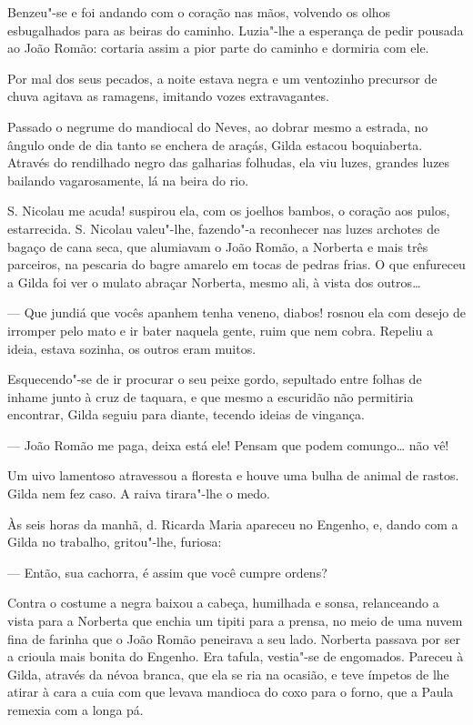 Benzeu"-se e foi andando com o coração nas mãos, volvendo os olhos
esbugalhados para as beiras do caminho. Luzia"-lhe a esperança de pedir
pousada ao João Romão: cortaria assim a pior parte do caminho e dormiria
com ele.

Por mal dos seus pecados, a noite estava negra e um ventozinho precursor
de chuva agitava as ramagens, imitando vozes extravagantes.

Passado o negrume do mandiocal do Neves, ao dobrar mesmo a estrada, no
ângulo onde de dia tanto se enchera de araçás, Gilda estacou
boquiaberta. Através do rendilhado negro das galharias folhudas, ela viu
luzes, grandes luzes bailando vagarosamente, lá na beira do rio.

S. Nicolau me acuda! suspirou ela, com os joelhos bambos, o coração aos
pulos, estarrecida. S. Nicolau valeu"-lhe, fazendo"-a reconhecer nas luzes
archotes de bagaço de cana seca, que alumiavam o João Romão, a Norberta
e mais três parceiros, na pescaria do bagre amarelo em tocas de pedras
frias. O que enfureceu a Gilda foi ver o mulato abraçar Norberta, mesmo
ali, à vista dos outros\ldots{}

--- Que jundiá que vocês apanhem tenha veneno, diabos! rosnou ela com
desejo de irromper pelo mato e ir bater naquela gente, ruim que nem
cobra. Repeliu a ideia, estava sozinha, os outros eram muitos.

Esquecendo"-se de ir procurar o seu peixe gordo, sepultado entre folhas
de inhame junto à cruz de taquara, e que mesmo a escuridão não
permitiria encontrar, Gilda seguiu para diante, tecendo ideias de
vingança.

--- João Romão me paga, deixa está ele! Pensam que podem comungo\ldots{} não
vê!

Um uivo lamentoso atravessou a floresta e houve uma bulha de animal de
rastos. Gilda nem fez caso. A raiva tirara"-lhe o medo.

Às seis horas da manhã, d. Ricarda Maria apareceu no Engenho, e, dando
com a Gilda no trabalho, gritou"-lhe, furiosa:

--- Então, sua cachorra, é assim que você cumpre ordens?

Contra o costume a negra baixou a cabeça, humilhada e sonsa, relanceando
a vista para a Norberta que enchia um tipiti para a prensa, no meio de
uma nuvem fina de farinha que o João Romão peneirava a seu lado.
Norberta passava por ser a crioula mais bonita do Engenho. Era tafula,
vestia"-se de engomados. Pareceu à Gilda, através da névoa branca, que
ela se ria na ocasião, e teve ímpetos de lhe atirar à cara a cuia com
que levava mandioca do coxo para o forno, que a Paula remexia com a
longa pá.

